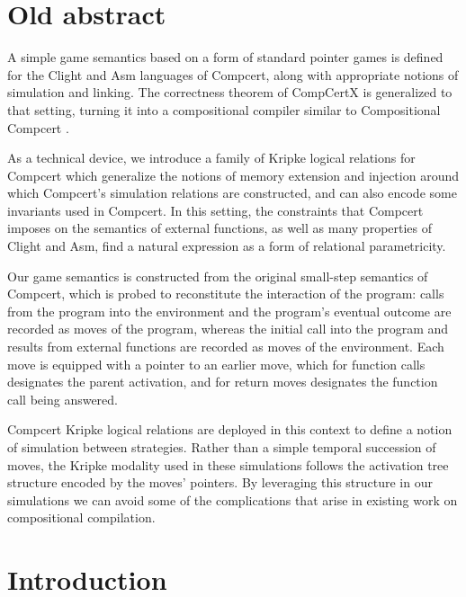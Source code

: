 \documentclass[sigplan,10pt,review,anonymous]{acmart}
\begin{document}



\appendix %

\section*{Old abstract}

A simple game semantics based on a form of standard pointer games
is defined for the Clight and Asm languages of Compcert,
along with appropriate notions of simulation and linking.
The correctness theorem of CompCertX \citep{popl15}
is generalized to that setting,
turning it into a compositional compiler
similar to Compositional Compcert \citep{compcomp}.

As a technical device,
we introduce a family of Kripke logical relations for Compcert
which generalize the notions of memory extension and injection
around which Compcert's simulation relations are constructed,
and can also encode some invariants used in Compcert.
In this setting,
the constraints that Compcert imposes on the semantics of external functions,
as well as many properties of Clight and Asm,
find a natural expression as a form of relational parametricity.

Our game semantics is constructed from the original
small-step semantics of Compcert,
which is probed to reconstitute the interaction of the program:
calls from the program into the environment and
the program's eventual outcome
are recorded as moves of the program,
whereas the initial call into the program and
results from external functions
are recorded as moves of the environment.
Each move is equipped with a pointer to an earlier move,
which for function calls designates the parent activation,
and for return moves designates the function call being answered.

Compcert Kripke logical relations are deployed in this context
to define a notion of simulation between strategies.
Rather than a simple temporal succession of moves,
the Kripke modality used in these simulations
follows the activation tree structure
encoded by the moves' pointers.
By leveraging this structure in our simulations
we can avoid some of the complications
that arise in existing work on compositional compilation.

\section{Introduction} %
\end{document}
